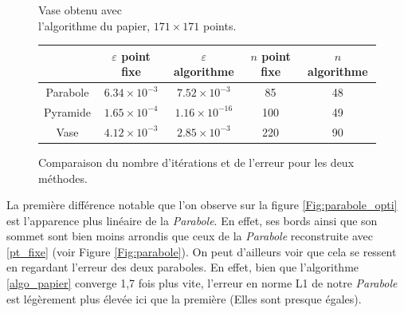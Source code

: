 \begin{figure}[!ht]
\centering
    \begin{minipage}[t]{0.48\textwidth}
        \centering
        \caption{Vase obtenu avec \\ \centering l'algorithme du papier, $171\times171$ points.}
        \label{Fig:vase_opti}
    \end{minipage}
\end{figure}

\begin{figure}[!htb] 
    \centering
    \renewcommand{\arraystretch}{1.5} %
    \begin{tabular}{|c|c|c|c|c|}\hline
         & $\varepsilon$ point fixe & $\varepsilon$ algorithme & $n$ point fixe & $n$ algorithme \\ \hline
        Parabole & $6.34 \times 10^{-3}$ & $7.52 \times 10^{-3}$ & 85 & 48 \\ \hline
        Pyramide & $1.65 \times 10^{-4}$ & $1.16 \times 10^{-16}$ & 100 & 49\\ \hline
        Vase     & $4.12 \times 10^{-3}$ & $2.85 \times 10^{-3}$ & 220 & 90 \\  \hline
    \end{tabular}
    \caption{Comparaison du nombre d'itérations et de l'erreur pour les deux méthodes.}
    \label{fig:comparaison_algo}
\end{figure}

La première différence notable que l'on observe sur la figure \ref{Fig:parabole_opti} est l'apparence plus linéaire de la \textit{Parabole}. En effet, ses bords ainsi que son sommet sont bien moins arrondis que ceux de la \textit{Parabole} reconstruite avec \eqref{pt_fixe} (voir Figure \ref{Fig:parabole}). On peut d'ailleurs voir que cela se ressent en regardant l'erreur des deux paraboles. En effet, bien que l'algorithme \eqref{algo_papier} converge 1,7 fois plus vite, l'erreur en norme L1 de notre \textit{Parabole} est légèrement plus élevée ici que la première (Elles sont presque égales).

